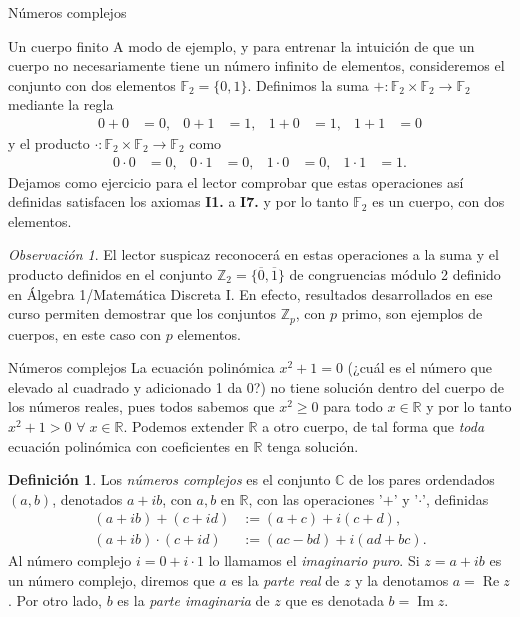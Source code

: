 \documentclass[a4paper,12pt,twoside,spanish,reqno]{amsbook}
\theoremstyle{definition}
\newtheorem{definicion}{Definici\'on}[section]
\theoremstyle{remark}
\newtheorem{obs}{Observaci\'on}[section]
\newcommand{\R}{\mathbb R}
\newcommand{\C}{\mathbb C}
\newcommand{\F}{\mathbb F}
\newcommand{\Z}{\mathbb Z}
\begin{document}
\begin{chapter}{Números complejos}
    
    \begin{subsection}{Un cuerpo finito}
        A modo de ejemplo, y para entrenar la intuición de que un cuerpo no necesariamente tiene un número infinito de elementos, consideremos el conjunto con dos elementos $\F_2=\{0,1\}$. Definimos la suma $+\colon\F_2\times \F_2\to \F_2$ mediante la regla
        \begin{align*}
        0+0&=0, & 0+1&=1, & 1+0&=1, & 1+1&=0
        \end{align*}
        y el producto $\cdot \colon\F_2\times \F_2\to \F_2$ como 
        \begin{align*}
        0\cdot 0&=0, & 0\cdot 1&=0, & 1\cdot 0&=0, & 1\cdot 1&=1.
        \end{align*}
        Dejamos como ejercicio para el lector comprobar que estas operaciones así definidas satisfacen los axiomas {\bf I1.} a {\bf I7.} y por lo tanto $\F_2$ es un cuerpo, con dos elementos.
        
        \begin{obs}
            El lector suspicaz reconocerá en estas operaciones a la suma y el producto definidos en el conjunto $\Z_2=\{\overline{0},\overline{1}\}$ de congruencias módulo 2  definido en Álgebra 1/Matemática Discreta I. En efecto, resultados desarrollados en ese curso permiten demostrar que los conjuntos $\Z_p$, con $p$ primo, son ejemplos de cuerpos, en este caso con $p$ elementos.
        \end{obs}
        
    \end{subsection}
    
    
    \begin{section}{Números complejos}
        La ecuación polinómica $x^2 + 1 =0$ (¿cuál es el número que elevado  al cuadrado y adicionado 1 da 0?) no tiene solución dentro del cuerpo de los números reales,  pues todos sabemos que  $x^2 \ge 0$ para todo $x \in \R$ y por lo tanto $x^2 + 1 >0$ $\forall\; x \in \R$. Podemos extender $\R$ a otro cuerpo,  de tal forma que \textit{toda} ecuación polinómica con coeficientes en $\R$ tenga solución. 
        
        \begin{definicion} 
            Los \textit{números complejos} es el conjunto $\C$  de los pares ordendados $(a,b)$,  denotados $a+ib$, con $a, b$  en $\R$, con las operaciones '$+$' y '$\cdot$', definidas
            \begin{align}
            (a+ib)+ (c+id) &:= (a+c) + i(c+d), \label{sumacompleja} \\
            (a+ib) \cdot (c+id) &:= (ac -bd) + i(ad+bc). \label{productocomplejo}
            \end{align}
            Al número complejo $i = 0 + i\cdot 1$ lo llamamos el \textit{imaginario puro}.  Si $z= a + ib$  es un número complejo,  diremos que $a$ es la \textit{parte real} de $z$ y  la denotamos $a = \operatorname{Re} z$. Por otro lado,  $b$ es la \textit{parte  imaginaria} de $z$ que es denotada $b = \operatorname{Im} z$.
        \end{definicion}
        

\end{section}
\end{chapter}
\end{document}
